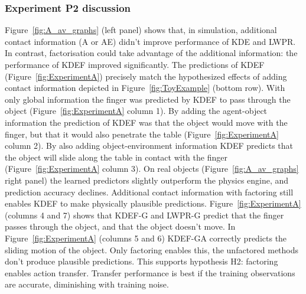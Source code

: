 \subsubsection{Experiment P2 discussion} 
Figure~\ref{fig:A_av_graphs} (left panel) shows that, in simulation, additional contact information (A or AE) didn't improve performance of KDE and LWPR. In contrast, factorisation could take advantage of the additional information: the performance of KDEF improved significantly. The predictions of KDEF (Figure~\ref{fig:ExperimentA}) precisely match the hypothesized
effects of adding contact information depicted in Figure~\ref{fig:ToyExample} (bottom row). With only global information the finger was predicted by KDEF to pass through the object (Figure~\ref{fig:ExperimentA} column 1). By adding the agent-object information the prediction of KDEF was that the object would move with the finger, but that it would also penetrate the table (Figure~\ref{fig:ExperimentA} column 2). By also adding object-environment information KDEF predicts that the object will slide along the table in contact with the finger (Figure~\ref{fig:ExperimentA} column 3). On real objects (Figure~\ref{fig:A_av_graphs} right panel) the learned predictors slightly outperform the physics engine, and prediction accuracy declines. Additional contact information with factoring still enables KDEF to make physically plausible predictions. Figure~\ref{fig:ExperimentA} (columns 4 and 7) shows that KDEF-G and LWPR-G predict that the finger passes through the object, and that the object doesn't move. In Figure~\ref{fig:ExperimentA} (columns 5 and 6) KDEF-GA correctly predicts the sliding motion of the object. Only factoring enables this, the unfactored methods don't produce plausible predictions. This supports hypothesis H2: factoring enables action transfer. Transfer performance is best if the training observations are accurate, diminishing with training noise. 

